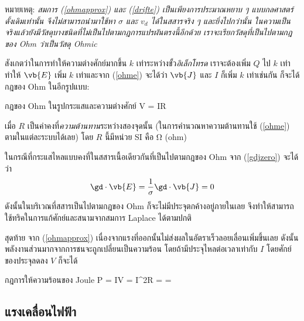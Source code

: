 หมายเหตุ: \emph{สมการ (\ref{ohmapprox}) และ (\ref{drifte}) เป็นเพียงการประมาณหยาบ ๆ แบบกลศาสตร์ดั้งเดิมเท่านั้น จึงไม่สามารถนำมาใช้หา $\sigma$ และ $v_d$ ได้ในสสารจริง ๆ และยิ่งไปกว่านั้น ในความเป็นจริงแล้วยังมีวัสดุบางชนิดที่ไม่เป็นไปตามกฎการแปรผันตรงนี้อีกด้วย เราจะเรียกวัสดุที่เป็นไปตามกฎของ Ohm ว่าเป็นวัสดุ Ohmic}

สังเกตว่าในการทำให้ความต่างศักย์มากขึ้น $k$ เท่าระหว่างขั้ว\emph{อิเล็กโทรด} เราจะต้องเพิ่ม $Q$ ไป $k$ เท่า ทำให้ $\vb{E}$ เพิ่ม $k$ เท่าและจาก (\ref{ohme}) จะได้ว่า $\vb{J}$ และ $I$ ก็เพิ่ม $k$ เท่าเช่นกัน ก็จะได้กฎของ Ohm ในอีกรูปแบบ:
\begin{ieqbox}{กฎของ Ohm ในรูปกระแสและความต่างศักย์} 
    V = IR \label{ohmv}
\end{ieqbox}
เมื่อ $R$ เป็นค่าคงที่\emph{ความต้านทาน}ระหว่างสองจุดนั้น (ในการคำนวณหาความต้านทานใช้ (\ref{ohme}) ตามในแต่ละระบบได้เลย) โดย $R$ นี้มีหน่วย SI คือ $\unit{\ohm}$ (ohm)

ในกรณีที่กระแสไหลแบบคงที่ในสสารเนื้อเดียวกันที่เป็นไปตามกฎของ Ohm จาก (\ref{gdjzero}) จะได้ว่า
\begin{equation} 
    \gd\cdot\vb{E} = \frac{1}{\sigma}\gd\cdot\vb{J} = 0 
\end{equation}
ดังนั้นในบริเวณที่สสารเป็นไปตามกฎของ Ohm ก็จะไม่มีประจุตกค้างอยู่ภายในเลย จึงทำให้สามารถใช้ทริคในการแก้ศักย์และสนามจากสมการ Laplace ได้ตามปกติ

สุดท้าย จาก (\ref{ohmapprox}) เนื่องจากแรงที่ออกนั้นไม่ส่งผลในอัตราเร็วลอยเลื่อนเพิ่มขึ้นเลย ดังนั้นพลังงานส่วนมากจากการชนจะถูกเปลี่ยนเป็นความร้อน โดยถ้ามีประจุไหลต่อเวลาเท่ากับ $I$ โดยศักย์ของประจุลดลง $V$ ก็จะได้
\begin{ieqbox}{กฎการให้ความร้อนของ Joule} 
    P = IV = I^2R =  =  \label{jouleheat}
\end{ieqbox}

\subsection{แรงเคลื่อนไฟฟ้า}

